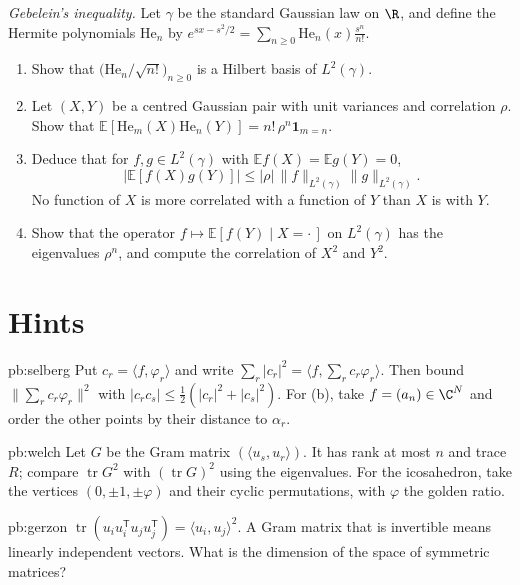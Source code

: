 \begin{exercise}[$\star\star\star$]\label{pb:gebelein}
\emph{Gebelein's inequality.} Let $\gamma$ be the standard Gaussian law on $\R$, and define the Hermite polynomials $\mathrm{He}_n$ by
$e^{sx-s^2/2}=\sum_{n\ge0}\mathrm{He}_n(x)\frac{s^n}{n!}$.
\begin{enumerate}[label=(\alph*)]
\item Show that $\bigl(\mathrm{He}_n/\sqrt{n!}\bigr)_{n\ge0}$ is a Hilbert basis of $L^2(\gamma)$.
\item Let $(X,Y)$ be a centred Gaussian pair with unit variances and correlation $\rho$. Show that $\mathbb E[\mathrm{He}_m(X)\mathrm{He}_n(Y)]=n!\,\rho^n\mathbf 1_{m=n}$.
\item Deduce that for $f,g\in L^2(\gamma)$ with $\mathbb E f(X)=\mathbb E g(Y)=0$,
\[
\bigl|\mathbb E[f(X)g(Y)]\bigr|\le|\rho|\,\|f\|_{L^2(\gamma)}\|g\|_{L^2(\gamma)}.
\]
No function of $X$ is more correlated with a function of $Y$ than $X$ is with $Y$.
\item Show that the operator $f\mapsto\mathbb E[f(Y)\mid X=\cdot\,]$ on $L^2(\gamma)$ has the eigenvalues $\rho^n$, and compute the correlation of $X^2$ and $Y^2$.
\end{enumerate}
\end{exercise}

\section*{Hints}

\begin{hint}{pb:selberg}
Put $c_r=\langle f,\varphi_r\rangle$ and write $\sum_r|c_r|^2=\langle f,\sum_rc_r\varphi_r\rangle$. Then bound $\|\sum_rc_r\varphi_r\|^2$ with $|c_rc_s|\le\frac12(|c_r|^2+|c_s|^2)$. For (b),
take $f=(a_n)\in\C^N$ and order the other points by their distance to $\alpha_r$.
\end{hint}

\begin{hint}{pb:welch}
Let $G$ be the Gram matrix $(\langle u_s,u_r\rangle)$. It has rank at most $n$ and trace $R$; compare $\operatorname{tr}G^2$ with $(\operatorname{tr}G)^2$ using the
eigenvalues. For the icosahedron, take the vertices $(0,\pm1,\pm\varphi)$ and their cyclic permutations, with $\varphi$ the golden ratio.
\end{hint}

\begin{hint}{pb:gerzon}
$\operatorname{tr}(u_iu_i^{\mathsf T}u_ju_j^{\mathsf T})=\langle u_i,u_j\rangle^2$. A Gram matrix that is invertible means linearly independent vectors. What is the dimension of the
space of symmetric matrices?
\end{hint}

